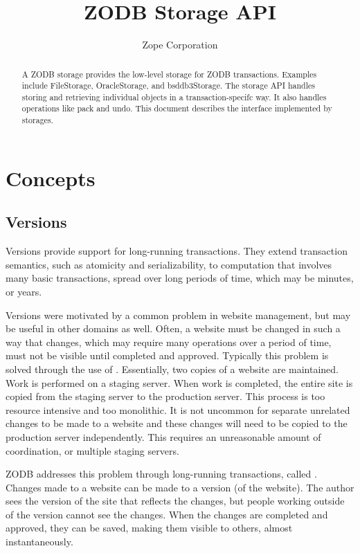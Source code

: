 \documentclass{howto}
\title{ZODB Storage API}
\author{Zope Corporation}
\begin{document}
\maketitle

\begin{abstract}
\noindent
A ZODB storage provides the low-level storage for ZODB transactions.
Examples include FileStorage, OracleStorage, and bsddb3Storage.  The
storage API handles storing and retrieving individual objects in a
transaction-specifc way.  It also handles operations like pack and
undo.  This document describes the interface implemented by storages.
\end{abstract}

\tableofcontents


\section{Concepts}

\subsection{Versions}

Versions provide support for long-running transactions.  They extend
transaction semantics, such as atomicity and serializability, to
computation that involves many basic transactions, spread over long
periods of time, which may be minutes, or years.

Versions were motivated by a common problem in website management,
but may be useful in other domains as well.  Often, a website must be
changed in such a way that changes, which may require many operations
over a period of time, must not be visible until completed and
approved.  Typically this problem is solved through the use of
.  Essentially, two copies of a website are
maintained.  Work is performed on a staging server.  When work is
completed, the entire site is copied from the staging server to the
production server.  This process is too resource intensive and too
monolithic.  It is not uncommon for separate unrelated changes to be
made to a website and these changes will need to be copied to the
production server independently.  This requires an unreasonable amount
of coordination, or multiple staging servers.

ZODB addresses this problem through long-running transactions, called
.  Changes made to a website can be made to a version
(of the website).  The author sees the version of the site that
reflects the changes, but people working outside of the version cannot
see the changes.  When the changes are completed and approved, they
can be saved, making them visible to others, almost instantaneously.
\end{document}
